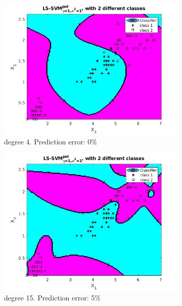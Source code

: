 \documentclass{article}
\begin{document}
\begin{figure}[]
		\begin{subfigure}{0.33\linewidth}
            \includegraphics[width=\linewidth]{iris_degree4}
            \caption{degree 4.
Prediction error: 0\%}
        \end{subfigure}
        \begin{subfigure}{0.33\linewidth}
            \includegraphics[width=\linewidth]{iris_degree_15}
            \caption{degree 15.
Prediction error: 5\%}
        \end{subfigure}
        \begin{subfigure}{0.33\linewidth}

\end{subfigure}
\end{figure}
\end{document}
